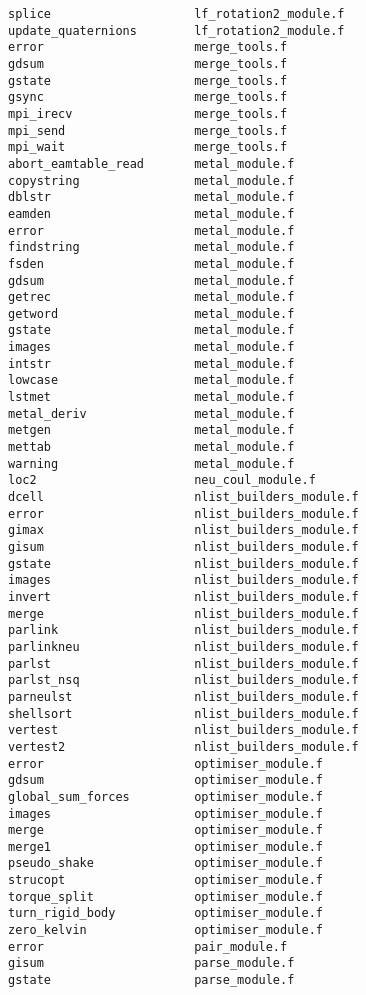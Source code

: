 \begin{verbatim}
splice                    lf_rotation2_module.f
update_quaternions        lf_rotation2_module.f
error                     merge_tools.f
gdsum                     merge_tools.f
gstate                    merge_tools.f
gsync                     merge_tools.f
mpi_irecv                 merge_tools.f
mpi_send                  merge_tools.f
mpi_wait                  merge_tools.f
abort_eamtable_read       metal_module.f
copystring                metal_module.f
dblstr                    metal_module.f
eamden                    metal_module.f
error                     metal_module.f
findstring                metal_module.f
fsden                     metal_module.f
gdsum                     metal_module.f
getrec                    metal_module.f
getword                   metal_module.f
gstate                    metal_module.f
images                    metal_module.f
intstr                    metal_module.f
lowcase                   metal_module.f
lstmet                    metal_module.f
metal_deriv               metal_module.f
metgen                    metal_module.f
mettab                    metal_module.f
warning                   metal_module.f
loc2                      neu_coul_module.f
dcell                     nlist_builders_module.f
error                     nlist_builders_module.f
gimax                     nlist_builders_module.f
gisum                     nlist_builders_module.f
gstate                    nlist_builders_module.f
images                    nlist_builders_module.f
invert                    nlist_builders_module.f
merge                     nlist_builders_module.f
parlink                   nlist_builders_module.f
parlinkneu                nlist_builders_module.f
parlst                    nlist_builders_module.f
parlst_nsq                nlist_builders_module.f
parneulst                 nlist_builders_module.f
shellsort                 nlist_builders_module.f
vertest                   nlist_builders_module.f
vertest2                  nlist_builders_module.f
error                     optimiser_module.f
gdsum                     optimiser_module.f
global_sum_forces         optimiser_module.f
images                    optimiser_module.f
merge                     optimiser_module.f
merge1                    optimiser_module.f
pseudo_shake              optimiser_module.f
strucopt                  optimiser_module.f
torque_split              optimiser_module.f
turn_rigid_body           optimiser_module.f
zero_kelvin               optimiser_module.f
error                     pair_module.f
gisum                     parse_module.f
gstate                    parse_module.f

\end{verbatim}
